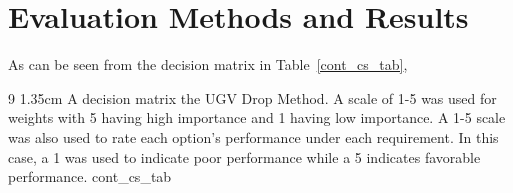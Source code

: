 \documentclass[]{auvsi_doc}
\begin{document}
\begin{AUVSITitlePage}
\begin{artifacttable}
\end{artifacttable}
\end{AUVSITitlePage}

\section{Evaluation Methods and Results}

As can be seen from the decision matrix in Table~\ref{cont_cs_tab}, 

\begin{AUVSITable}
{9}
{1.35cm}
{A decision matrix the UGV Drop Method. A scale of 1-5 was used for weights with 5 having high importance and 1 having low importance. A 1-5 scale was also used to rate each option’s performance under each requirement. In this case, a 1 was used to indicate poor performance while a 5 indicates favorable performance.}
{cont_cs_tab}


\end{AUVSITable}


\end{document}
